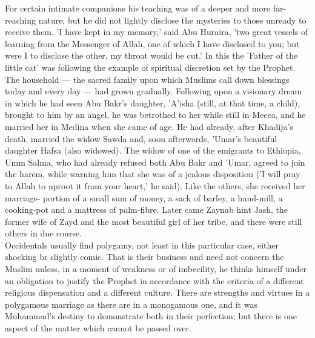\documentclass[11pt, b5paper, twoside]{book}
\begin{document}
For certain intimate companions his teaching was of a deeper and more far-reaching nature, but he did 
not lightly disclose the mysteries to those unready to receive them. 'I have kept in my memory,' said 
Abu Huraira, 'two great vessels of learning from the Messenger of Allah, one of which I have 
disclosed to you; but were I to disclose the other, my throat would be cut.' In this the 'Father of 
the little cat' was following the example of spiritual discretion set by the Prophet. \\

The household --- the sacred family upon which Muslims call down blessings today and every day --- had 
grown gradually. Following upon a visionary dream in which he had seen Abu Bakr's daughter, 'A'isha 
(still, at that time, a child), brought to him by an angel, he was betrothed to her while still in 
Mecca, and he married her in Medina when she came of age. He had already, after Khadija's death, 
married the widow Sawda and, soon afterwards, 'Umar's beautiful daughter Hafsa (also widowed). The 
widow of one of the emigrants to Ethiopia, Umm Salma, who had already refused both Abu Bakr and 
'Umar, agreed to join the harem, while warning him that she was of a jealous disposition ('I will 
pray to Allah to uproot it from your heart,' he said). Like the others, she received her marriage-
portion of a small sum of money, a sack of barley, a hand-mill, a cooking-pot and a mattress of 
palm-fibre. Later came Zaynab hint Jash, the former wife of Zayd and the most beautiful girl of her 
tribe, and there were still others in due course. \\

Occidentals usually find polygamy, not least in this particular case, either shocking br slightly 
comic. That is their business and need not concern the Muslim unless, in a moment of weakness or of 
imbecility, he thinks himself under an obligation to justify the Prophet in accordance with the 
criteria of a different religious dispensation and a different culture. There are strengths and 
virtues in a polygamous marriage as there are in a monogamous one, and it was Muhammad's destiny to 
demonstrate both in their perfection; but there is one aspect of the matter which cannot be passed 
over. \\
\end{document}
